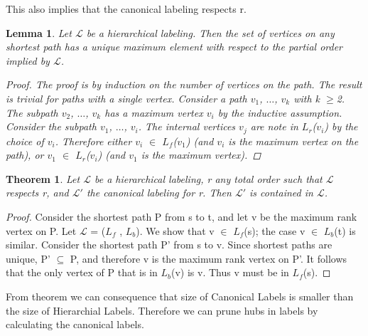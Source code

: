 \documentclass[english,draft]{article}
\begin{document}
				This also implies that the canonical labeling respects r. \\
\newtheorem{max_unique}{Lemma}
	\begin{max_unique}
		Let $\mathcal{L}$ be a hierarchical labeling. Then the set of vertices on any shortest path has
		a unique maximum element with respect to the partial order implied by $\mathcal{L}$.
		\begin{proof}
			The proof is by induction on the number of vertices on the path.
			The result is trivial for paths with a single vertex.
 			Consider a path $\mathit{{v}_{1}}$, $\dots$, $\mathit{{v}_{k}}$ with k $\geq$2.
 			The subpath $\mathit{{v}_{2}}$,  $\dots$, $\mathit{{v}_{k}}$ has a maximum vertex $\mathit{{v}_{i}}$ 	                
 			by the inductive assumption.
 			Consider the subpath $\mathit{{v}_{1}}$,  $\dots$, $\mathit{{v}_{i}}$. 
 			The internal vertices $\mathit{{v}_{j}}$ are note in ${L}_{r}$(${v}_{i}$) by the choice of ${v}_{i}$.
 			Therefore either ${v}_{i}$ $\in$ ${L}_{f}$(${v}_{1}$) (and ${v}_{i}$ is the maximum vertex on the path),
 			or ${v}_{1}$ $\in$ ${L}_{r}$(${v}_{i}$) (and ${v}_{1}$ is the maximum vertex).

 			
 			
 			
		\end{proof}

	\end{max_unique}
	
\newtheorem{H_in_C}{Theorem}

 \begin{H_in_C}
 

	Let $\mathcal{L}$ be a hierarchical labeling, r any total order such that $\mathcal{L}$
	respects r, and $\mathcal{L'}$ the canonical labeling for r. Then $\mathcal{L'}$ is contained in $\mathcal{L}$.
 \end{H_in_C}
\begin{proof}
Consider the shortest path P from s to t, and let v be the maximum
rank vertex on P. Let $\mathcal{L}$ = (${L}_{f}$ , ${L}_{b}$).
We show that v $\in$ ${L}_{f}$(s); the case v $\in$ ${L}_{b}$(t)
is similar.
Consider the shortest path P' from s to v. Since shortest paths are
unique, P' $\subseteq$ P, and therefore v is the maximum rank vertex on P'.
It follows
that the only vertex of P that is in ${L}_{b}$(v) is v. Thus v must be in ${L}_{f}$(s). 


\end{proof}
From theorem we can consequence that size of Canonical Labels is smaller than the size of Hierarchial Labels.	
Therefore we can prune hubs in labels by calculating the canonical labels.
\end{document}
